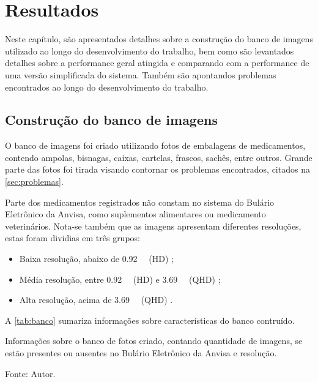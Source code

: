 \chapter{Resultados}\label{cap:resultados}


Neste capítulo, são apresentados detalhes sobre a construção do banco de imagens utilizado ao longo do desenvolvimento do trabalho, bem como são levantados detalhes sobre a performance geral atingida e comparando com a performance de uma versão simplificada do sistema.
Também são apontandos problemas encontrados ao longo do desenvolvimento do trabalho.

\section{Construção do banco de imagens}

O banco de imagens foi criado utilizando fotos de embalagens de medicamentos, contendo ampolas, bisnagas, caixas, cartelas, frascos, sachês, entre outros.
Grande parte das fotos foi tirada visando contornar os problemas encontrados, citados na \autoref{sec:problemas}.

Parte dos medicamentos registrados não constam no sistema do Bulário Eletrônico da \ac{Anvisa}, como suplementos alimentares ou medicamento veterinários.
Nota-se também que as imagens apresentam diferentes resoluções, estas foram dividias em três grupos:
\begin{itemize}
    \item Baixa resolução, abaixo de \SI{0.92}{\mega\pixel} (HD) \cite{makiyama2022Imagens};
    \item Média resolução, entre \SI{0.92}{\mega\pixel} (HD) e \SI{3.69}{\mega\pixel} (QHD) \cite{makiyama2022Imagens};
    \item Alta resolução, acima de \SI{3.69}{\mega\pixel} (QHD) \cite{makiyama2022Imagens}.
\end{itemize}
A \autoref{tab:banco} sumariza informações sobre características do banco contruído.

\begin{table}[htbp]
    \centering
    \caption{Informações sobre o banco de fotos criado, contando quantidade de imagens, se estão presentes ou ausentes no Bulário Eletrônico da \ac{Anvisa} e resolução.}
    \medskip
    \caption*{Fonte: Autor.}
    \label{tab:banco}
\end{table}

